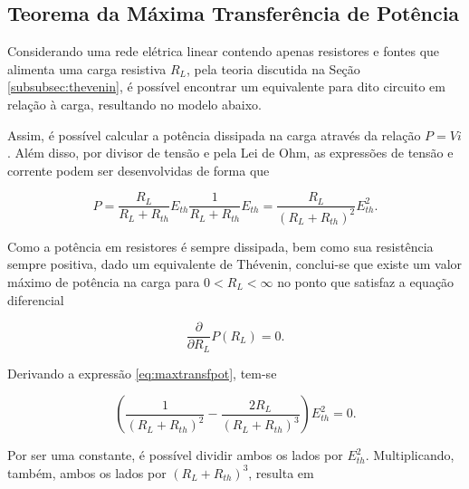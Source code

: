 \documentclass{article}
\numberwithin{equation}{section}
\let\dfr\dfrac
\begin{document}
\subsection{Teorema da Máxima Transferência de Potência}
\label{subsec:maxpot}

Considerando uma rede elétrica linear contendo apenas resistores e fontes que alimenta uma carga resistiva $R_L$, pela teoria discutida na Seção \ref{subsubsec:thevenin}, é possível encontrar um equivalente para dito circuito em relação à carga, resultando no modelo abaixo.

\begin{center}
\end{center}

\noindent Assim, é possível calcular a potência dissipada na carga através da relação $P = Vi$. Além disso, por divisor de tensão e pela Lei de Ohm, as expressões de tensão e corrente podem ser desenvolvidas de forma que

\begin{equation}
    P = \dfr{R_L}{R_L+R_{th}}E_{th} \dfr{1}{R_L+R_{th}}E_{th} = \dfr{R_L}{(R_L+R_{th})^2}E_{th}^2. \label{eq:maxtransfpot}
\end{equation}

\noindent Como a potência em resistores é sempre dissipada, bem como sua resistência sempre positiva, dado um equivalente de Thévenin, conclui-se que existe um valor máximo de potência na carga para $0 < R_L < \infty$ no ponto que satisfaz a equação diferencial

\begin{equation*}
    \dfr{\partial}{\partial R_L}P(R_L) = 0.
\end{equation*}

\noindent Derivando a expressão \eqref{eq:maxtransfpot}, tem-se

\begin{equation*}
    \left(\dfr{1}{(R_L+R_{th})^2} - \dfr{2R_L}{(R_L+R_{th})^3}\right)E_{th}^2 = 0.
\end{equation*}

\noindent Por ser uma constante, é possível dividir ambos os lados por $E_{th}^2$. Multiplicando, também, ambos os lados por $(R_L+R_{th})^3$, resulta em
\end{document}
